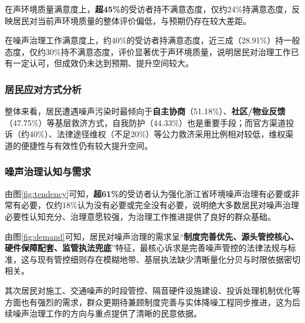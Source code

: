 在声环境质量满意度上，\textbf{超45\%}的受访者持不满意态度，仅约24\%持满意态度，反映居民对当前声环境质量的整体评价偏低，与预期仍存在较大差距。

在噪声治理工作满意度上，约40\%的受访者持满意态度，近三成（28.91\%）持一般态度，仅约30\%持不满意态度，评价显著优于声环境质量，说明居民对治理工作已有一定认可，但成效仍未达到预期、提升空间较大。

\subsubsection{居民应对方式分析}


整体来看，居民遭遇噪声污染时最倾向于\textbf{自主协商}（51.18\%）、\textbf{社区/物业反馈}（47.75\%）等基层救济方式，自我防护（44.33\%）也是重要手段；而官方渠道投诉（约40\%）、法律途径维权（不足20\%）等公力救济采用比例相对较低，维权渠道的便捷性与有效性仍有较大提升空间。

\subsubsection{噪声治理认知与需求}


由图\ref{fig:tendency}可知，\textbf{超61\%}的受访者认为强化浙江省环境噪声治理有必要或非常有必要，仅约18\%认为没有必要或完全没有必要，说明绝大多数居民对噪声治理必要性认知充分、治理意愿较强，为治理工作推进提供了良好的群众基础。


由图\ref{fig:demand}可知，居民对噪声治理的需求呈“\textbf{制度完善优先、源头管控核心、硬件保障配套、监管执法兜底}”特征，最核心诉求是完善噪声管控的法律法规与标准，这与现有管控细则存在模糊地带、基层执法缺少清晰量化分贝与时限依据密切相关。

其次居民对施工、交通噪声的时段管控、隔音硬件设施建设、投诉处理机制优化等方面也有强烈的需求，群众更期待兼顾制度完善与实体降噪工程同步推进，这为后续噪声治理工作的方向与重点提供了清晰的民意依据。

